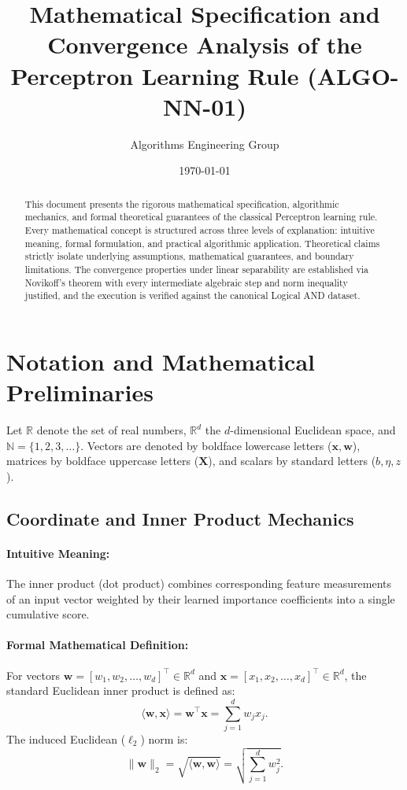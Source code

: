 \documentclass[11pt]{article}
\title{Mathematical Specification and Convergence Analysis of the Perceptron Learning Rule (ALGO-NN-01)}
\author{Algorithms Engineering Group}
\date{\today}
\begin{document}
\maketitle

\begin{abstract}
This document presents the rigorous mathematical specification, algorithmic mechanics, and formal theoretical guarantees of the classical Perceptron learning rule. Every mathematical concept is structured across three levels of explanation: intuitive meaning, formal formulation, and practical algorithmic application. Theoretical claims strictly isolate underlying assumptions, mathematical guarantees, and boundary limitations. The convergence properties under linear separability are established via Novikoff's theorem with every intermediate algebraic step and norm inequality justified, and the execution is verified against the canonical Logical AND dataset.
\end{abstract}

\section{Notation and Mathematical Preliminaries}
\label{sec:notation}

Let $\mathbb{R}$ denote the set of real numbers, $\mathbb{R}^d$ the $d$-dimensional Euclidean space, and $\mathbb{N} = \{1, 2, 3, \dots\}$. Vectors are denoted by boldface lowercase letters ($\mathbf{x}, \mathbf{w}$), matrices by boldface uppercase letters ($\mathbf{X}$), and scalars by standard letters ($b, \eta, z$).

\subsection{Coordinate and Inner Product Mechanics}
\paragraph{Intuitive Meaning:} The inner product (dot product) combines corresponding feature measurements of an input vector weighted by their learned importance coefficients into a single cumulative score.

\paragraph{Formal Mathematical Definition:}
For vectors $\mathbf{w} = [w_1, w_2, \dots, w_d]^\top \in \mathbb{R}^d$ and $\mathbf{x} = [x_1, x_2, \dots, x_d]^\top \in \mathbb{R}^d$, the standard Euclidean inner product is defined as:
\begin{equation}
\label{eq:dot_product}
\langle \mathbf{w}, \mathbf{x} \rangle = \mathbf{w}^\top \mathbf{x} = \sum_{j=1}^d w_j x_j.
\end{equation}
The induced Euclidean ($\ell_2$) norm is:
\begin{equation}
\|\mathbf{w}\|_2 = \sqrt{\langle \mathbf{w}, \mathbf{w} \rangle} = \sqrt{\sum_{j=1}^d w_j^2}.
\end{equation}
\end{document}
